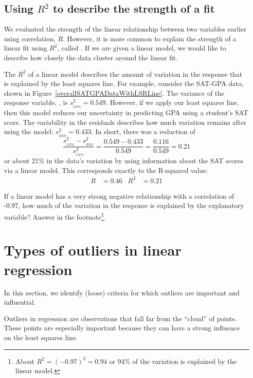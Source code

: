 \subsection{Using $R^2$ to describe the strength of a fit}

We evaluated the strength of the linear relationship between two variables earlier using correlation, $R$. However, it is more common to explain the strength of a linear fit using $R^2$, called . If we are given a linear model, we would like to describe how closely the data cluster around the linear fit.

The $R^2$ of a linear model describes the amount of variation in the response that is explained by the least squares line. For example, consider the SAT-GPA data, shown in Figure~\ref{overallSATGPADataWithLSRLine}. The variance of the response variable, , is $s_{_{GPA}}^2=0.549$. However, if we apply our least squares line, then this model reduces our uncertainty in predicting GPA using a student's SAT score. The variability in the residuals describes how much variation remains after using the model: $s_{_{RES}}^2 = 0.433$. In short, there was a reduction of
$$\frac{s_{_{GPA}}^2 - s_{_{RES}}^2}{s_{_{GPA}}^2}
	= \frac{0.549 - 0.433}{0.549} = \frac{0.116}{0.549}
	= 0.21$$
or about  21\% in the data's variation by using information about the SAT scores via a linear model. This corresponds exactly to the R-squared value:
\begin{align*}
R &= 0.46 &R^2 &= 0.21
\end{align*}

\begin{exercise}
If a linear model has a very strong negative relationship with a correlation of -0.97, how much of the variation in the response is explained by the explanatory variable? Answer in the footnote\footnote{About $R^2 = (-0.97)^2 = 0.94$ or 94\% of the variation is explained by the linear model.}.
\end{exercise}

\section{Types of outliers in linear regression}
\label{typesOfOutliersInLinearRegression}

In this section, we identify (loose) criteria for which outliers are important and influential.

Outliers in regression are observations that fall far from the ``cloud'' of points. These points are especially important because they can have a strong influence on the least squares line. 

